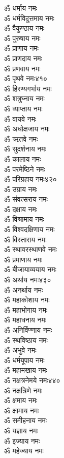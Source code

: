 \begin{multicols}{2}
\begin{flushleft}
ॐ धर्माय नमः\\
ॐ धर्मविदुत्तमाय नमः\\
ॐ वैकुण्ठाय नमः\\
ॐ पुरुषाय नमः\\
ॐ प्राणाय नमः\\
ॐ प्राणदाय नमः\\
ॐ प्रणवाय नमः\\
ॐ पृथवे नमः\hfill ४१०\\
ॐ हिरण्यगर्भाय नमः\\
ॐ शत्रुघ्नाय नमः\\
ॐ व्याप्ताय नमः\\
ॐ वायवे नमः\\
ॐ अधोक्षजाय नमः\\
ॐ ऋतवे नमः\\
ॐ सुदर्शनाय नमः\\
ॐ कालाय नमः\\
ॐ परमेष्ठिने नमः\\
ॐ परिग्रहाय नमः\hfill ४२०\\
ॐ उग्राय नमः\\
ॐ संवत्सराय नमः\\
ॐ दक्षाय नमः\\
ॐ विश्रामाय नमः\\
ॐ विश्वदक्षिणाय नमः\\
ॐ विस्ताराय नमः\\
ॐ स्थावरस्थाणवे नमः\\
ॐ प्रमाणाय नमः\\
ॐ बीजायाव्ययाय नमः\\
ॐ अर्थाय नमः\hfill ४३०\\
ॐ अनर्थाय नमः\\
ॐ महाकोशाय नमः\\
ॐ महाभोगाय नमः\\
ॐ महाधनाय नमः\\
ॐ अनिर्विण्णाय नमः\\
ॐ स्थविष्ठाय नमः\\
ॐ अभुवे नमः\\
ॐ धर्मयूपाय नमः\\
ॐ महामखाय नमः\\
ॐ नक्षत्रनेमये नमः\hfill ४४०\\
ॐ नक्षत्रिणे नमः\\
ॐ क्षमाय नमः\\
ॐ क्षामाय नमः\\
ॐ समीहनाय नमः\\
ॐ यज्ञाय नमः\\
ॐ इज्याय नमः\\
ॐ महेज्याय नमः\\

\end{flushleft}
\end{multicols}
